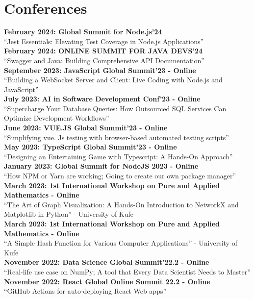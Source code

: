 \documentclass[a4paper,10pt]{article}
\begin{document}
\section{\textbf{Conferences}}
\textbf{February 2024: Global Summit for Node.js'24}\\
“Jest Essentials: Elevating Test Coverage in Node.js Applications”\\
\textbf{February 2024: ONLINE SUMMIT FOR JAVA DEVS'24}\\
“Swagger and Java: Building Comprehensive API Documentation”\\
\textbf{September 2023: JavaScript Global Summit’23 - Online}\\
“Building a WebSocket Server and Client: Live Coding with Node.js and JavaScript”\\
\textbf{July 2023: AI in Software Development Conf’23 - Online}\\
“Supercharge Your Database Queries: How Outsourced SQL Services Can Optimize Development Workflows”\\
\textbf{June 2023: VUE.JS Global Summit’23 - Online}\\
“Simplifying vue. Js testing with browser-based automated testing scripts”\\
\textbf{May 2023: TypeScript Global Summit’23 - Online}\\
“Designing an Entertaining Game with Typescript: A Hands-On Approach”\\
\textbf{January 2023: Global Summit for NodeJS 2023 - Online}\\
“How NPM or Yarn are working; Going to create our own package manager”\\
\textbf{March 2023: 1st International Workshop on Pure and Applied Mathematics - Online}\\
“The Art of Graph Visualization: A Hands-On Introduction to NetworkX and Matplotlib in Python” - University of Kufe\\
\textbf{March 2023: 1st International Workshop on Pure and Applied Mathematics - Online}\\
“A Simple Hash Function for Various Computer Applications” - University of Kufe\\
\textbf{November 2022: Data Science Global Summit’22.2 - Online}\\
“Real-life use case on NumPy; A tool that Every Data Scientist Needs to Master”\\
\textbf{November 2022: React Global Online Summit 22.2 - Online}\\
“GitHub Actions for auto-deploying React Web apps”\\
\end{document}
